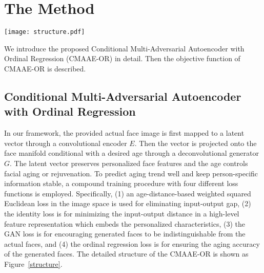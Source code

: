 \documentclass{article}
\begin{document}
\section{The Method}\label{approach}

\begin{figure*}[ht!]
\centering
\texttt{[image: structure.pdf]}
\caption{Structure of the proposed CMAAE-OR framework for facial aging and rejuvenation. A convolutional encoder $E$ and a deconvolutional generator $G$ learn the age transformation in tandem. The training of CMAAE-OR incorporates four different losses: (1) the GAN loss that encourages generated faces to be indistinguishable from the provided actual faces, (2) the ordinal regression loss that makes generated faces exhibit desirable aging effect, (3) the weighted squared Euclidean loss in the image space that eliminates the input-output gap, and (4) the identity loss to minimizes the input-output distance by a latent features $z$, which embeds personalized characteristics.}
\label{structure}
\end{figure*}

We introduce the proposed Conditional Multi-Adversarial Autoencoder with Ordinal Regression (CMAAE-OR) in detail. Then the objective function of CMAAE-OR is described.

\subsection{Conditional Multi-Adversarial Autoencoder with Ordinal Regression}\label{CMAAE}
In our framework, the provided actual face image is first mapped to a latent vector through a convolutional encoder $E$. Then the vector is projected onto the face manifold conditional with a desired age through a deconvolutional generator $G$. The latent vector preserves personalized face features and the age controls facial aging or rejuvenation. To predict aging trend well and keep person-specific information stable, a compound training procedure with four different loss functions is employed. Specifically, (1) an age-distance-based weighted squared Euclidean loss in the image space is used for eliminating input-output gap, (2) the identity loss is for minimizing the input-output distance in a high-level feature representation which embeds the personalized characteristics, (3) the GAN loss is for encouraging generated faces to be indistinguishable from the actual faces, and (4) the ordinal regression loss is for ensuring the aging accuracy of the generated faces. The detailed structure of the CMAAE-OR is shown as Figure~\ref{structure}.
\end{document}
